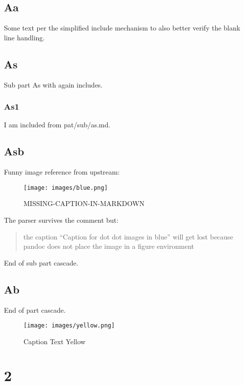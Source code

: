 \hypertarget{aa}{%
\subsection{Aa}\label{aa}}

Some text per the simplified include mechanism to also better verify the
blank line handling.

\hypertarget{as}{%
\subsection{As}\label{as}}

Sub part As with again includes.

\hypertarget{as1}{%
\subsubsection{As1}\label{as1}}

I am included from pat/sub/as.md.

\hypertarget{asb}{%
\subsection{Asb}\label{asb}}

Funny image reference from upstream:


\begin{figure}
\centering
\texttt{[image: images/blue.png]}
\caption{MISSING-CAPTION-IN-MARKDOWN \label{fig:blue}}
\end{figure}

The parser survives the comment but:

\begin{quote}
the caption ``Caption for dot dot images in blue'' will get lost because
pandoc does not place the image in a figure environment
\end{quote}

End of sub part cascade.

\hypertarget{ab}{%
\subsection{Ab}\label{ab}}

End of part cascade.

\begin{figure}
\centering
\texttt{[image: images/yellow.png]}
\caption{Caption Text Yellow \label{fig:yellow}}
\end{figure}

\hypertarget{section-1}{%
\section{2}\label{section-1}}

